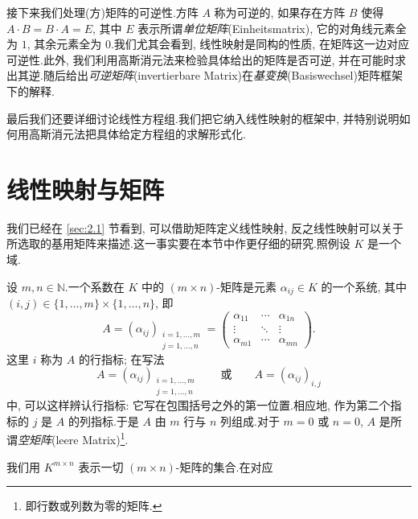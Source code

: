 接下来我们处理(方)矩阵的可逆性.方阵 $A$ 称为可逆的, 如果存在方阵 $B$ 使得 $A \cdot B = B \cdot A = E$, 其中 $E$ 表示所谓\emph{单位矩阵}(\textup{Einheitsmatrix}), 它的对角线元素全为 $1$, 其余元素全为 $0$.我们尤其会看到, 线性映射是同构的性质, 在矩阵这一边对应可逆性.此外, 我们利用高斯消元法来检验具体给出的矩阵是否可逆, 并在可能时求出其逆.随后给出\emph{可逆矩阵}(\textup{invertierbare Matrix})在\emph{基变换}(\textup{Basiswechsel})矩阵框架下的解释.

最后我们还要详细讨论线性方程组.我们把它纳入线性映射的框架中, 并特别说明如何用高斯消元法把具体给定方程组的求解形式化.

\section{线性映射与矩阵}\label{sec:3.1}

我们已经在 \ref{sec:2.1} 节看到, 可以借助矩阵定义线性映射, 反之线性映射可以关于所选取的基用矩阵来描述.这一事实要在本节中作更仔细的研究.照例设 $K$ 是一个域.

\begin{definition}[$(m \times n)$-矩阵]\label{def:3.1.1}
设 $m, n \in \mathbb{N}$.一个系数在 $K$ 中的 $(m \times n)$-矩阵是元素 $\alpha_{ij} \in K$ 的一个系统, 其中 $(i, j) \in \{1, \ldots, m\} \times \{1, \ldots, n\}$, 即
\[
A = (\alpha_{ij})_{\substack{i = 1, \ldots, m\\ j = 1, \ldots, n}} =
\begin{pmatrix}
\alpha_{11} & \cdots & \alpha_{1n} \\
\vdots & \ddots & \vdots \\
\alpha_{m1} & \cdots & \alpha_{mn}
\end{pmatrix}\text{.}
\]
这里 $i$ 称为 $A$ 的行指标; 在写法
\[
A = (\alpha_{ij})_{\substack{i = 1, \ldots, m\\ j = 1, \ldots, n}} \qquad \text{或} \qquad A = (\alpha_{ij})_{i, j}
\]
中, 可以这样辨认行指标: 它写在包围括号之外的第一位置.相应地, 作为第二个指标的 $j$ 是 $A$ 的列指标.于是 $A$ 由 $m$ 行与 $n$ 列组成.对于 $m = 0$ 或 $n = 0$, $A$ 是所谓\emph{空矩阵}(\textup{leere Matrix})\footnote{即行数或列数为零的矩阵.}.
\end{definition}

我们用 $K^{m \times n}$ 表示一切 $(m \times n)$-矩阵的集合.在对应

